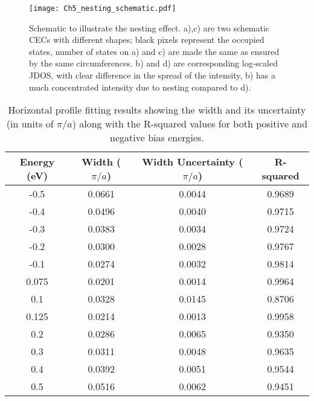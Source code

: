 \begin{figure}
	\texttt{[image: Ch5\_nesting\_schematic.pdf]} 
	\centering
	\caption{Schematic to illustrate the nesting effect. a),c) are two schematic \ac{CEC}s with different shapes; black pixels represent the occupied states, number of states on a) and c) are made the same as ensured by the same circumferences. b) and d) are corresponding log-scaled \ac{JDOS}, with clear difference in the spread of the intensity, b) has a much concentrated intensity due to nesting compared to d).}
	\label{fig:ch5_schema_nesting}
\end{figure}

\begin{table}
	\centering
	\begin{tabular}{|c|c|c|c|}
		\hline
		Energy (eV) & Width ($\pi/a$) & Width Uncertainty ($\pi/a$) & R-squared \\
		\hline
		-0.5 & 0.0661 & 0.0044 & 0.9689 \\
		-0.4 & 0.0496 & 0.0040 & 0.9715 \\
		-0.3 & 0.0383 & 0.0034 & 0.9724 \\
		-0.2 & 0.0300 & 0.0028 & 0.9767 \\
		-0.1 & 0.0274 & 0.0032 & 0.9814 \\
		\hline
		0.075 & 0.0201 & 0.0014 & 0.9964 \\
		0.1 & 0.0328 & 0.0145 & 0.8706 \\
		0.125 & 0.0214 & 0.0013 & 0.9958 \\
		0.2 & 0.0286 & 0.0065 & 0.9350 \\
		0.3 & 0.0311 & 0.0048 & 0.9635 \\
		0.4 & 0.0392 & 0.0051 & 0.9544 \\
		0.5 & 0.0516 & 0.0062 & 0.9451 \\
		\hline
	\end{tabular}
	\caption{Horizontal profile fitting results showing the width and its uncertainty (in units of $\pi/a$) along with the R-squared values for both positive and negative bias energies.}
	\label{tab:qpi_fit_results_combined}
\end{table}

